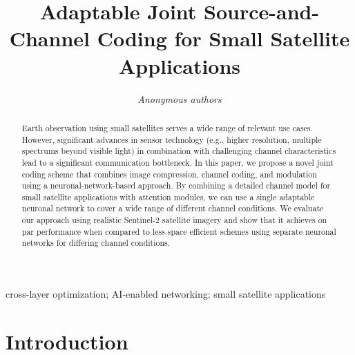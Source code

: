 \documentclass[conference]{IEEEtran}
\newcommand\sentinelii{Sentinel-2\xspace}
\begin{document}
\title{Adaptable Joint Source-and-Channel Coding for Small Satellite Applications}

\author{\emph{Anonymous authors}}

\maketitle

\begin{abstract}
Earth observation using small satellites serves a wide range of relevant use cases.
However, significant advances in sensor technology (e.g., higher resolution, multiple spectrums beyond visible light) in combination with challenging channel characteristics lead to a significant communication bottleneck.
In this paper, we propose a novel joint coding scheme that combines image compression, channel coding, and modulation using a neuronal-network-based approach.
By combining a detailed channel model for small satellite applications with attention modules, we can use a single adaptable neuronal network to cover a wide range of different channel conditions.
We evaluate our approach using realistic \sentinelii satellite imagery and show that it achieves on par performance when compared to less space efficient schemes using separate neuronal networks for differing channel conditions.
\end{abstract}

\begin{IEEEkeywords}
  cross-layer optimization; AI-enabled networking; small satellite applications
  \end{IEEEkeywords}

\acresetall
\section{Introduction}
\end{document}

